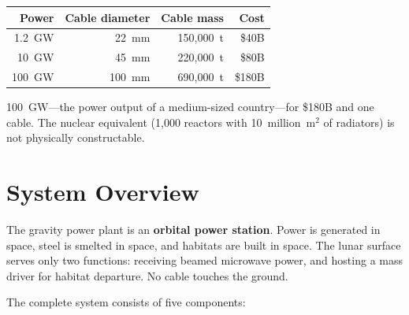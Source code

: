 \documentclass[12pt,letterpaper]{article}
\begin{document}
\begin{enumerate}[label=\arabic*.]
\begin{center}
\small
\begin{tabular}{rrrr}
\toprule
\textbf{Power} & \textbf{Cable diameter} & \textbf{Cable mass} & \textbf{Cost} \\
\midrule
1.2~GW & 22~mm & 150,000~t & \$40B \\
10~GW & 45~mm & 220,000~t & \$80B \\
100~GW & 100~mm & 690,000~t & \$180B \\
\bottomrule
\end{tabular}
\end{center}

100~GW---the power output of a medium-sized country---for \$180B and one cable. The nuclear equivalent (1,000 reactors with 10~million~m$^2$ of radiators) is not physically constructable.
\end{enumerate}

\section{System Overview}

The gravity power plant is an \textbf{orbital power station}. Power is generated in space, steel is smelted in space, and habitats are built in space. The lunar surface serves only two functions: receiving beamed microwave power, and hosting a mass driver for habitat departure. No cable touches the ground.

The complete system consists of five components:
\end{document}
